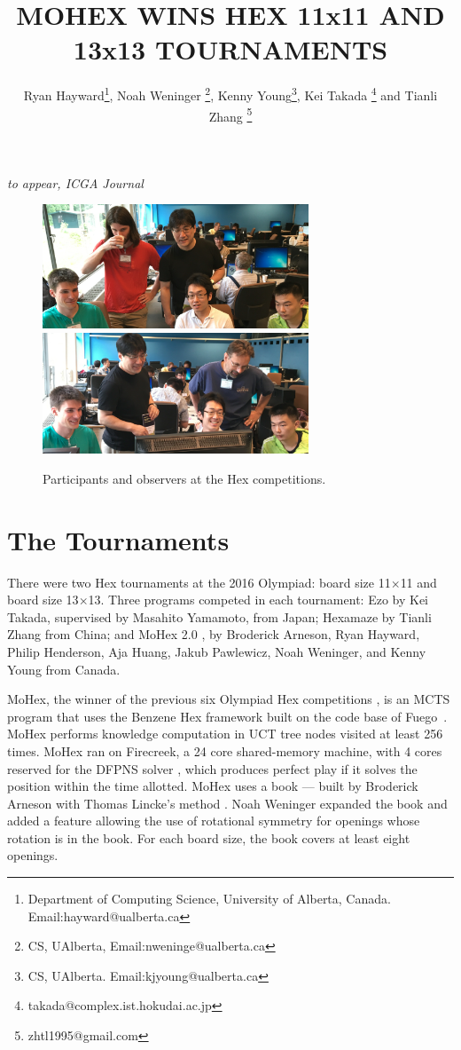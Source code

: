 \documentclass{icga}
\title{\sc MOHEX WINS HEX 11x11 AND 13x13 TOURNAMENTS}
\author{Ryan Hayward\thanks{Department 
of Computing Science, University of Alberta, Canada. Email:hayward@ualberta.ca},
Noah Weninger \thanks{CS, UAlberta, Email:nweninge@ualberta.ca},
Kenny Young\thanks{CS, UAlberta. Email:kjyoung@ualberta.ca},
Kei Takada \thanks{takada@complex.ist.hokudai.ac.jp} and
Tianli Zhang \thanks{zhtl1995@gmail.com}
}
\affiliation{Edmonton, Canada}
\newif\iflong\longfalse  %
\def\Eo{\mbox{\sc Ezo}}
\def\Hz{\mbox{\sc Hexamaze}}
\def\Mx{\mbox{\sc MoHex}}
\def\Fuego{\mbox{\sc Fuego}}
\begin{document}
\maketitle

\iflong
In the longer version of the report, we include all games.
\fi

\vspace*{-2.25in}
{\it to appear, ICGA Journal}
\vspace*{2.0in}

\begin{figure}[hbt]
\includegraphics[width=225pt]{photos/pick.eps}\
\includegraphics[width=225pt]{photos/picr.eps}
\caption{Participants and observers at the Hex competitions.}
\end{figure}

\section{The Tournaments}
There were two Hex tournaments at the 2016 Olympiad:
board size 11$\times$11 and board size 13$\times$13.
Three programs competed in each tournament:
\Eo{} by Kei Takada, supervised by Masahito Yamamoto, from Japan;
\Hz{} by Tianli Zhang from China; and
\Mx{} 2.0 , 
by Broderick Arneson, Ryan Hayward, Philip Henderson, Aja Huang, 
Jakub Pawlewicz, Noah Weninger, and Kenny Young from Canada.

\Mx{}, the winner of the previous six Olympiad Hex competitions
,
is an MCTS program that uses the Benzene Hex framework
built on the code base of \Fuego\ .
\Mx{} performs knowledge computation in UCT tree nodes visited at least 256 times.
\Mx{} ran on Firecreek, a 24 core shared-memory machine, 
with 4 cores reserved for the 
DFPNS solver , which
produces perfect play if it solves the
position within the time allotted.
\Mx{} uses a book ---
built by Broderick Arneson with Thomas Lincke's method 
. 
Noah Weninger expanded the book and added a feature
allowing the use of rotational symmetry for openings
whose rotation is in the book.
For each board size, the book covers at least eight openings.
\end{document}
